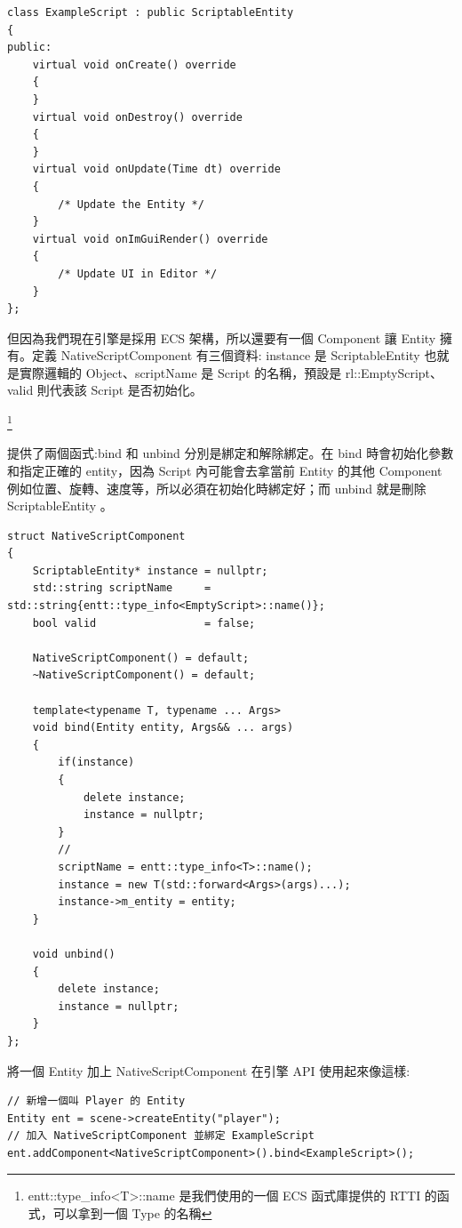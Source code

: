 \begin{lstlisting}
class ExampleScript : public ScriptableEntity
{
public:
    virtual void onCreate() override
    {
    }
    virtual void onDestroy() override
    {
    }
    virtual void onUpdate(Time dt) override
    {
    	/* Update the Entity */
    }
    virtual void onImGuiRender() override
    {
    	/* Update UI in Editor */
    }
};
\end{lstlisting}

但因為我們現在引擎是採用 ECS 架構，所以還要有一個 Component 讓 Entity 擁有。定義 NativeScriptComponent 有三個資料: instance 是 ScriptableEntity 也就是實際邏輯的 Object、scriptName 是 Script 的名稱，預設是 rl::EmptyScript、valid 則代表該 Script 是否初始化。

\footnote{entt::type\_info<T>::name\(\) 是我們使用的一個 ECS 函式庫提供的 RTTI 的函式，可以拿到一個 Type 的名稱}

提供了兩個函式:bind\(\) 和 unbind\(\) 分別是綁定和解除綁定。在 bind\(\) 時會初始化參數和指定正確的 entity，因為 Script 內可能會去拿當前 Entity 的其他 Component \(例如位置、旋轉、速度等\)，所以必須在初始化時綁定好；而 unbind\(\) 就是刪除 ScriptableEntity 。

\begin{lstlisting}
struct NativeScriptComponent
{
    ScriptableEntity* instance = nullptr;
    std::string scriptName     = std::string{entt::type_info<EmptyScript>::name()};
    bool valid                 = false;

    NativeScriptComponent() = default;
    ~NativeScriptComponent() = default;

    template<typename T, typename ... Args>
    void bind(Entity entity, Args&& ... args)
    {
        if(instance)
        {
            delete instance;
            instance = nullptr;
        }
        //
        scriptName = entt::type_info<T>::name();
        instance = new T(std::forward<Args>(args)...);
        instance->m_entity = entity;
    }

    void unbind()
    {
        delete instance;
        instance = nullptr;
    }
};
\end{lstlisting}

將一個 Entity 加上 NativeScriptComponent 在引擎 API 使用起來像這樣:

\begin{lstlisting}
// 新增一個叫 Player 的 Entity
Entity ent = scene->createEntity("player");
// 加入 NativeScriptComponent 並綁定 ExampleScript
ent.addComponent<NativeScriptComponent>().bind<ExampleScript>();
\end{lstlisting}

